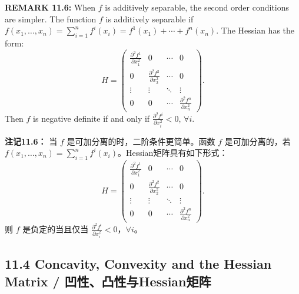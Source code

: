 \begin{original}
\textbf{REMARK 11.6:} When $f$ is additively separable, the second order conditions are simpler. The function $f$ is additively separable if $f(x_1,\ldots,x_n) = \sum_{i=1}^n f^i(x_i) = f^1(x_1) + \cdots + f^n(x_n)$. The Hessian has the form:
\[
H = \begin{pmatrix}
\frac{\partial^2 f^1}{\partial x_1^2} & 0 & \cdots & 0 \\
0 & \frac{\partial^2 f^2}{\partial x_2^2} & \cdots & 0 \\
\vdots & \vdots & \ddots & \vdots \\
0 & 0 & \cdots & \frac{\partial^2 f^n}{\partial x_n^2}
\end{pmatrix}.
\]
Then $f$ is negative definite if and only if $\frac{\partial^2 f^i}{\partial x_i^2} < 0$, $\forall i$.
\end{original}
\begin{translation}
\textbf{注记11.6：} 当 $f$ 是可加分离的时，二阶条件更简单。函数 $f$ 是可加分离的，若 $f(x_1,\ldots,x_n) = \sum_{i=1}^n f^i(x_i)$。Hessian矩阵具有如下形式：
\[
H = \begin{pmatrix}
\frac{\partial^2 f^1}{\partial x_1^2} & 0 & \cdots & 0 \\
0 & \frac{\partial^2 f^2}{\partial x_2^2} & \cdots & 0 \\
\vdots & \vdots & \ddots & \vdots \\
0 & 0 & \cdots & \frac{\partial^2 f^n}{\partial x_n^2}
\end{pmatrix}.
\]
则 $f$ 是负定的当且仅当 $\frac{\partial^2 f^i}{\partial x_i^2} < 0$，$\forall i$。
\end{translation}

\subsection{11.4 Concavity, Convexity and the Hessian Matrix / 凹性、凸性与Hessian矩阵}

